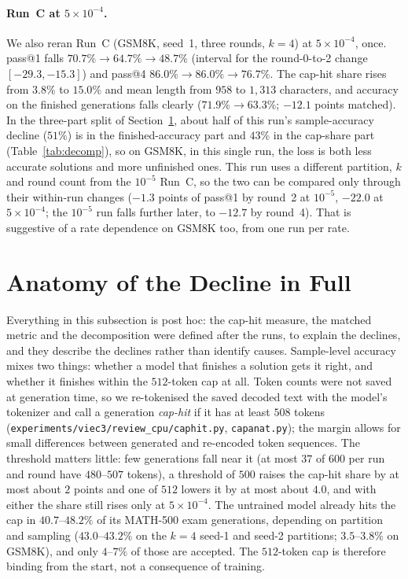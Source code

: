 \documentclass[runningheads]{llncs}
\begin{document}
\paragraph{Run~C at $5\times10^{-4}$.}
We also reran Run~C (GSM8K, seed~1, three rounds, $k=4$) at $5\times10^{-4}$, once.
pass@1 falls $70.7\%\to64.7\%\to48.7\%$ (interval for the round-0-to-2 change
$[-29.3,-15.3]$) and pass@4 $86.0\%\to86.0\%\to76.7\%$. The cap-hit share rises from
$3.8\%$ to $15.0\%$ and mean length from $958$ to $1{,}313$ characters, and
accuracy on the finished generations falls clearly ($71.9\%\to63.3\%$; $-12.1$
points matched). In the three-part split of Section~\ref{app:anatomy}, about
half of this run's sample-accuracy decline ($51\%$) is in the finished-accuracy
part and $43\%$ in the cap-share part (Table~\ref{tab:decomp}), so on GSM8K, in this single run, the loss is
both less accurate solutions and more unfinished ones. This
run uses a different partition, $k$ and round count from the $10^{-5}$ Run~C, so
the two can be compared only through their within-run changes ($-1.3$ points of
pass@1 by round~2 at $10^{-5}$, $-22.0$ at $5\times10^{-4}$; the $10^{-5}$ run
falls further later, to $-12.7$ by round~4). That is suggestive
of a rate dependence on GSM8K too, from one run per rate.

\section{Anatomy of the Decline in Full}
\label{app:anatomy}

Everything in this subsection is post hoc: the cap-hit measure, the matched
metric and the decomposition were defined after the runs, to explain the
declines, and they describe the declines rather than identify causes.
Sample-level accuracy mixes two things: whether a model that finishes a solution
gets it right, and whether it finishes within the $512$-token cap at all. Token
counts were not saved at generation time, so we re-tokenised the saved decoded
text with the model's tokenizer and call a generation \emph{cap-hit} if it has at
least $508$ tokens (\texttt{experiments/viec3/review\_cpu/caphit.py},
\texttt{capanat.py}); the margin allows for small differences between generated
and re-encoded token sequences. The threshold matters little: few generations
fall near it (at most $37$ of $600$ per run and round have $480$--$507$ tokens),
a threshold of $500$ raises the cap-hit share by at most about $2$ points and
one of $512$ lowers it by at most about $4.0$, and with either the share still
rises only at $5\times10^{-4}$. The untrained model already hits the cap in
$40.7$--$48.2\%$ of its MATH-500 exam generations, depending on partition and
sampling ($43.0$--$43.2\%$ on the $k=4$ seed-1 and seed-2 partitions; $3.5$--$3.8\%$
on GSM8K), and only $4$--$7\%$ of those are accepted.
The $512$-token cap is therefore binding from the start, not a consequence of
training.
\end{document}
